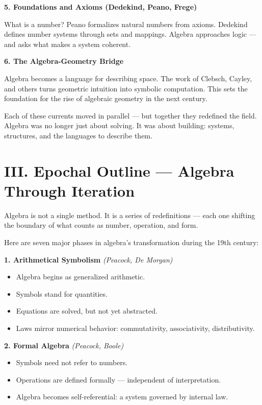 \documentclass[9pt]{article}
\begin{document}
\bigskip

\textbf{5. Foundations and Axioms (Dedekind, Peano, Frege)}

What is a number?  
Peano formalizes natural numbers from axioms.  
Dedekind defines number systems through sets and mappings.  
Algebra approaches logic — and asks what makes a system coherent.

\bigskip

\textbf{6. The Algebra-Geometry Bridge}

Algebra becomes a language for describing space.  
The work of Clebsch, Cayley, and others turns geometric intuition into symbolic computation.  
This sets the foundation for the rise of algebraic geometry in the next century.

\bigskip

Each of these currents moved in parallel — but together they redefined the field.  
Algebra was no longer just about solving.  
It was about building: systems, structures, and the languages to describe them.

\newpage

\section*{III. Epochal Outline — Algebra Through Iteration}

Algebra is not a single method.  
It is a series of redefinitions — each one shifting the boundary of what counts as number, operation, and form.

Here are seven major phases in algebra’s transformation during the 19th century:

\bigskip

\textbf{1. Arithmetical Symbolism} \hfill \textit{(Peacock, De Morgan)}

\begin{itemize}
  \item Algebra begins as generalized arithmetic.
  \item Symbols stand for quantities.  
  \item Equations are solved, but not yet abstracted.
  \item Laws mirror numerical behavior: commutativity, associativity, distributivity.
\end{itemize}

\bigskip

\textbf{2. Formal Algebra} \hfill \textit{(Peacock, Boole)}

\begin{itemize}
  \item Symbols need not refer to numbers.
  \item Operations are defined formally — independent of interpretation.
  \item Algebra becomes self-referential: a system governed by internal law.
\end{itemize}
\end{document}
